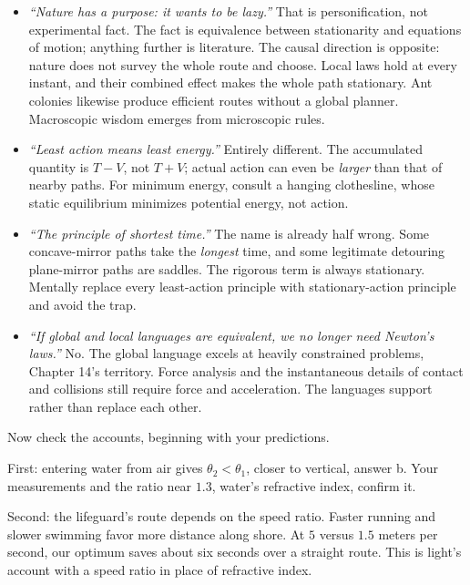 \begin{itemize}[leftmargin=1.8em]
  \item \emph{``Nature has a purpose: it wants to be lazy.''} That is personification, not experimental fact. The fact is equivalence between stationarity and equations of motion; anything further is literature. The causal direction is opposite: nature does not survey the whole route and choose. Local laws hold at every instant, and their combined effect makes the whole path stationary. Ant colonies likewise produce efficient routes without a global planner. Macroscopic wisdom emerges from microscopic rules.
  \item \emph{``Least action means least energy.''} Entirely different. The accumulated quantity is \(T-V\), not \(T+V\); actual action can even be \emph{larger} than that of nearby paths. For minimum energy, consult a hanging clothesline, whose static equilibrium minimizes potential energy, not action.
  \item \emph{``The principle of shortest time.''} The name is already half wrong. Some concave-mirror paths take the \emph{longest} time, and some legitimate detouring plane-mirror paths are saddles. The rigorous term is always stationary. Mentally replace every least-action principle with stationary-action principle and avoid the trap.
  \item \emph{``If global and local languages are equivalent, we no longer need Newton's laws.''} No. The global language excels at heavily constrained problems, Chapter 14's territory. Force analysis and the instantaneous details of contact and collisions still require force and acceleration. The languages support rather than replace each other.
\end{itemize}


Now check the accounts, beginning with your predictions.

First: entering water from air gives \(\theta_2<\theta_1\), closer to vertical, answer b. Your measurements and the ratio near \(1.3\), water's refractive index, confirm it.

Second: the lifeguard's route depends on the speed ratio. Faster running and slower swimming favor more distance along shore. At \(5\) versus \(1.5\) meters per second, our optimum saves about six seconds over a straight route. This is light's account with a speed ratio in place of refractive index.


